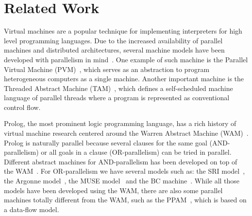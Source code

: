 \section{Related Work}
\label{related_work}

Virtual machines are a popular technique for implementing interpreters
for high level programming languages.  Due to the increased
availability of parallel machines and distributed architectures,
several machine models have been developed with parallelism in
mind~\cite{Kara:1997:AMM:265274}.  One example of such machine is the
Parallel Virtual Machine (PVM)~\cite{Sunderam90pvm:a}, which serves as
an abstraction to program heterogeneous computers as a single
machine. Another important machine is the Threaded Abstract Machine
(TAM)~\cite{CullerGSvE93,goldstein-tr94}, which defines a
self-scheduled machine language of parallel threads where a program is
represented as conventional control flow.

Prolog, the most prominent logic programming language, has a rich
history of virtual machine research centered around the Warren
Abstract Machine (WAM)~\cite{AICPub641:1983}. 
Prolog is naturally parallel because several clauses for the same goal
(AND-parallelism) or all goals in a clause (OR-parallelism) can be
tried in parallel. Different abstract machines for AND-parallelism has
been developed on top of the
WAM~\cite{Hermenegildo:1986:AMB:913061,Lin:1988:AEL:900478}.  For
OR-parallelism we have several models such as: the SRI
model~\cite{Warren:1987:OEM:67683.67699}, the Argonne
model~\cite{ButlerDLOOS88}, the MUSE model~\cite{Ali:1990fk} and the
BC machine~\cite{Ali88}. While all those models have been developed
using the WAM, there are also some parallel machines totally different
from the WAM, such as the PPAM~\cite{Kacsuk:1990:EMP:533578}, which is
based on a data-flow model.

